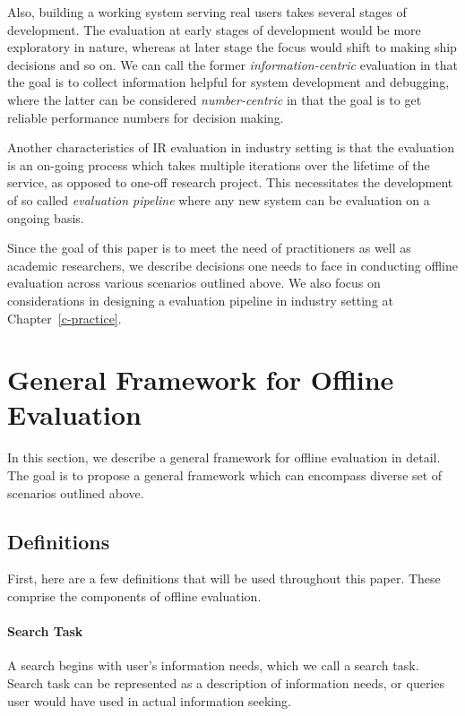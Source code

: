 \documentclass[openany]{now} %
\begin{document}
Also, building a working system serving real users takes several stages of development. The evaluation at early stages of development would be more exploratory in nature, whereas at later stage the focus would shift to making ship decisions and so on. We can call the former \textit{information-centric} evaluation in that the goal is to collect information helpful for system development and debugging, where the latter can be considered \textit{number-centric} in that the goal is to get reliable performance numbers for decision making.

Another characteristics of IR evaluation in industry setting is that the evaluation is an on-going process which takes multiple iterations over the lifetime of the service, as opposed to one-off research project. This necessitates the development of so called \textit{evaluation pipeline} where any new system can be evaluation on a ongoing basis.  

Since the goal of this paper is to meet the need of practitioners as well as academic researchers, we describe decisions one needs to face in conducting offline evaluation across various scenarios outlined above. We also focus on considerations in designing a evaluation pipeline in industry setting at Chapter~\ref{c-practice}.

\section{General Framework for Offline Evaluation}

In this section, we describe a general framework for offline evaluation in detail. The goal is to propose a general framework which can encompass diverse set of scenarios outlined above. 

\subsection{Definitions}

First, here are a few definitions that will be used throughout this paper. These comprise the components of offline evaluation.

\paragraph{Search Task} A search begins with user's information needs, which we call a search task. Search task can be represented as a description of information needs, or queries user would have used in actual information seeking.
\end{document}
